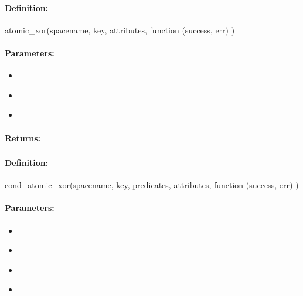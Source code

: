 \paragraph{Definition:}
\begin{javascriptcode}
atomic_xor(spacename, key, attributes, function (success, err) {})
\end{javascriptcode}
\paragraph{Parameters:}
\begin{itemize}[noitemsep]
\item {}\\

\item {}\\

\item {}\\

\end{itemize}

\paragraph{Returns:}


\pagebreak
\subsubsection{}
\label{api:nodejs:cond_atomic_xor}


\paragraph{Definition:}
\begin{javascriptcode}
cond_atomic_xor(spacename, key, predicates, attributes, function (success, err) {})
\end{javascriptcode}
\paragraph{Parameters:}
\begin{itemize}[noitemsep]
\item {}\\

\item {}\\

\item {}\\

\item {}\\

\end{itemize}

